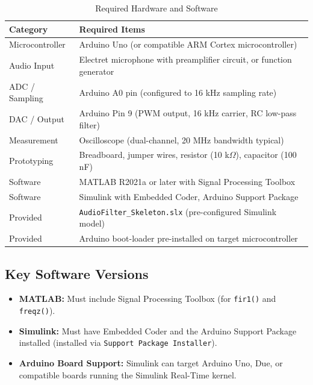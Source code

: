 \documentclass[11pt,letterpaper]{article}
\begin{document}
\begin{table}[H]
    \centering
    \caption{Required Hardware and Software}
    \label{tab:equipment}
    \begin{tabularx}{\linewidth}{l X}
    \toprule
    \textbf{Category} & \textbf{Required Items}\\
    \midrule
    Microcontroller & Arduino Uno (or compatible ARM Cortex microcontroller)\\
    Audio Input & Electret microphone with preamplifier circuit, or function generator\\
    ADC / Sampling & Arduino A0 pin (configured to 16 kHz sampling rate)\\
    DAC / Output & Arduino Pin 9 (PWM output, 16 kHz carrier, RC low-pass filter)\\
    Measurement & Oscilloscope (dual-channel, 20 MHz bandwidth typical)\\
    Prototyping & Breadboard, jumper wires, resistor (10 k$\Omega$), capacitor (100 nF)\\
    Software & MATLAB R2021a or later with Signal Processing Toolbox\\
    Software & Simulink with Embedded Coder, Arduino Support Package\\
    Provided & \texttt{AudioFilter\_Skeleton.slx} (pre-configured Simulink model)\\
    Provided & Arduino boot-loader pre-installed on target microcontroller\\
    \bottomrule
    \end{tabularx}
\end{table}

\subsection*{Key Software Versions}

\begin{itemize}
    \item \textbf{MATLAB:} Must include Signal Processing Toolbox (for \texttt{fir1()} and \texttt{freqz()}).
    \item \textbf{Simulink:} Must have Embedded Coder and the Arduino Support Package installed (installed via \texttt{Support Package Installer}).
    \item \textbf{Arduino Board Support:} Simulink can target Arduino Uno, Due, or compatible boards running the Simulink Real-Time kernel.
\end{itemize}
\end{document}
